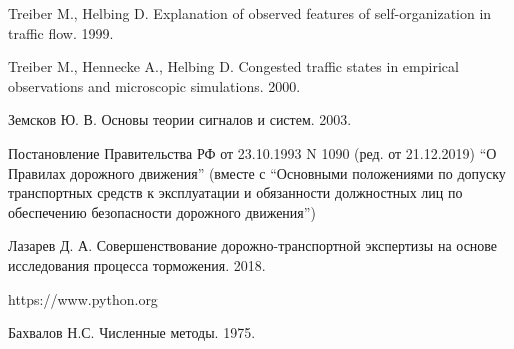 \documentclass[12pt, a4paper]{extarticle}
\numberwithin{equation}{section}
\numberwithin{figure}{section}
\begin{document}
\begin{thebibliography}{**}
	Treiber M., Helbing D. Explanation of observed features of self-organization in traffic flow.
	1999.
	
	Treiber M., Hennecke A., Helbing D. Congested traffic states in empirical observations and
	microscopic simulations. 2000.
	
	Земсков Ю. В. Основы теории сигналов и систем. 2003.
	
	Постановление Правительства РФ от 23.10.1993 N 1090 (ред. от 21.12.2019) ``О Правилах дорожного движения'' (вместе с ``Основными положениями по допуску транспортных средств к эксплуатации и обязанности должностных лиц по обеспечению безопасности дорожного движения'')

	Лазарев Д. А. Совершенствование дорожно-транспортной экспертизы на основе исследования процесса торможения. 2018.

	https://www.python.org
	
	Бахвалов Н.С.  Численные методы. 1975. 

\end{thebibliography}

\newpage
\end{document}
